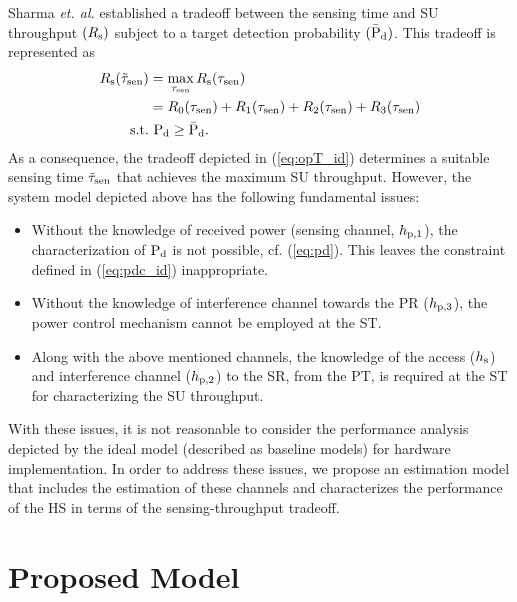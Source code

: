 Sharma \textit{et. al.} \cite{Sharma14} established a tradeoff between the sensing time and SU throughput $(R_{\text{s}})$ subject to a target detection probability $(\bar{\text{P}}_{\text{d}})$. This tradeoff is represented as
\begin{align}
R_{\text{s}}(\tilde{\tau}_{\text{sen}}) &= \operatorname*{max}_{\tau_{\text{sen}}} R_{\text{s}}(\tau_{\text{sen}}) \label{eq:opT_id}\\ 
\quad &= R_{\text{0}}(\tau_{\text{sen}}) + R_{\text{1}}(\tau_{\text{sen}}) + R_{\text{2}}(\tau_{\text{sen}}) + R_{\text{3}}(\tau_{\text{sen}}) \nonumber  \\
\text{s.t.} & \text{ } \text{P}_{\text{d}} \ge \bar{\text{P}}_{\text{d}}. \label{eq:pdc_id} 
\end{align}
As a consequence, the tradeoff depicted in (\ref{eq:opT_id}) determines a suitable sensing time $\tilde{\tau}_{\text{sen}}$ that achieves the maximum SU throughput.
However, the system model depicted above has the following fundamental issues:
\begin{itemize}
\item Without the knowledge of received power (sensing channel, $h_{\text{p,1}}$), the characterization of $\text{P}_{\text{d}}$ is not possible, cf. (\ref{eq:pd}). This leaves the constraint defined in (\ref{eq:pdc_id}) inappropriate. 
\item Without the knowledge of interference channel towards the PR ($h_{\text{p,3}}$), the power control mechanism cannot be employed at the ST.
\item Along with the above mentioned channels, the knowledge of the access ($h_{\text{s}}$) and interference channel ($h_{\text{p,2}}$) to the SR, from the PT, is required at the ST for characterizing the SU throughput. 
\end{itemize} 
With these issues, it is not reasonable to consider the performance analysis depicted by the ideal model (described as baseline models) for hardware implementation. In order to address these issues, we propose an estimation model that includes the estimation of these channels and characterizes the performance of the HS in terms of the sensing-throughput tradeoff. 
\section{Proposed Model} \label{sec:pm}
